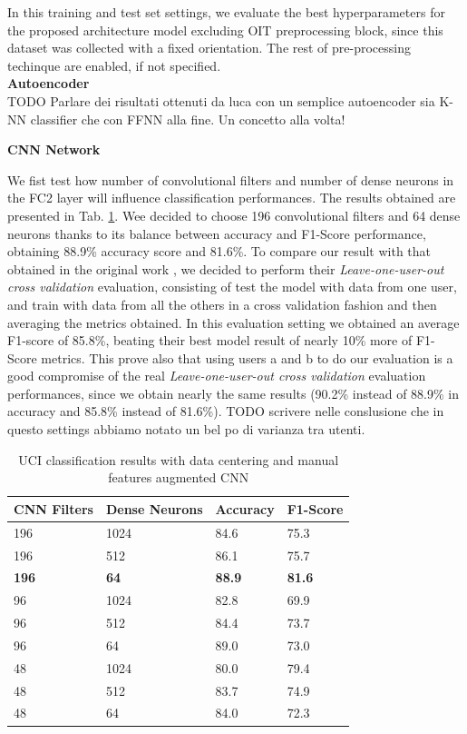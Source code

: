 In this training and test set settings, we evaluate the best hyperparameters for the proposed architecture model excluding OIT preprocessing block, since this dataset was collected with a fixed orientation. The rest of pre-processing techinque are enabled, if not specified.\\ 

\textbf{Autoencoder}\\
TODO Parlare dei risultati ottenuti da luca con un semplice autoencoder sia K-NN classifier che con FFNN alla fine. Un concetto alla volta!

\textbf{CNN Network}

We fist test how number of convolutional filters and number of dense neurons in the FC2 layer will influence classification performances. The results obtained are presented in Tab. \ref{tab:model-selection}. Wee decided to choose 196 convolutional filters and 64 dense neurons thanks to its balance between accuracy and F1-Score performance, obtaining 88.9\% accuracy score and  81.6\%. To compare our result with that obtained in the original work \cite{blunck2013heterogeneity}, we decided to perform their \textit{Leave-one-user-out cross validation} evaluation, consisting of test the model with data from one user, and train with data from all the others in a cross validation fashion and then averaging the metrics obtained. In this evaluation setting we obtained an average F1-score of 85.8\%, beating their best model result of nearly 10\% more of F1-Score metrics. This prove also that using users a and b to do our evaluation is a good compromise of the real \textit{Leave-one-user-out cross validation} evaluation performances, since we obtain nearly the same results (90.2\% instead of 88.9\% in accuracy and 85.8\% instead of 81.6\%). TODO scrivere nelle conslusione che in questo settings abbiamo notato un bel po di varianza tra utenti.

\begin{table}[h]
	\begin{center}
		\begin{tabular}{ p{1.8cm}p{1.7cm}p{1.7cm}p{1.7cm} } 
			\hline
			CNN Filters & Dense Neurons & Accuracy & F1-Score \\ 
			\hline
			196 & 1024 & 84.6 & 75.3 \\
			196 & 512 & 86.1 & 75.7 \\ 
			\textbf{196} & \textbf{64} & \textbf{88.9} & \textbf{81.6} \\ 
			96 & 1024 & 82.8 & 69.9 \\
			96 & 512 & 84.4 & 73.7 \\ 
			96 & 64 & 89.0 & 73.0 \\  
			48 & 1024 & 80.0 & 79.4 \\
			48 & 512 & 83.7 & 74.9 \\ 
			48 & 64 & 84.0 & 72.3 \\
			\hline
		\end{tabular}
		\caption{\label{tab:model-selection} UCI classification results with data centering and manual features augmented CNN}
	\end{center}
\end{table}


